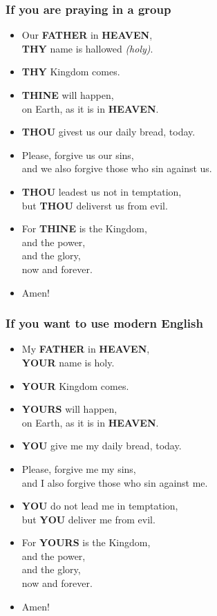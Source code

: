 \documentclass[12pt,a4paper]{article}
\newcommand{\Father}[0]{\textbf{FATHER}}
\newcommand{\Heaven}[0]{\textbf{HEAVEN}}
\newcommand{\Thine}[0]{\textbf{THINE}}
\newcommand{\Thou}[0]{\textbf{THOU}}
\newcommand{\Thy}[0]{\textbf{THY}}
\newcommand{\You}[0]{\textbf{YOU}}
\newcommand{\Your}[0]{\textbf{YOUR}}
\newcommand{\Yours}[0]{\textbf{YOURS}}
\begin{document}
		\subsubsection{If you are praying in a group}
			\begin{itemize}[nosep]
				\item	Our {\Father} in {\Heaven},
						\\
						{\Thy} name is hallowed \textit{(holy)}.
				\item	{\Thy} Kingdom comes.
				\item	{{\Thine} will happen},
						\\
						on Earth,
						as it is in {\Heaven}.
				\item	{\Thou} givest us our daily bread,
						today.
				\item	Please,
						forgive us our sins,
						\\
						and we also forgive those who sin against us.
				\item	{\Thou} leadest us not in temptation,
						\\
						but {\Thou} deliverst us from evil.
				\item	For {\Thine} is the Kingdom,
						\\
						and the power,
						\\
						and the glory,
						\\
						now and forever.
				\item	Amen!
			\end{itemize}

		\subsubsection{If you want to use modern English}
			\begin{itemize}[nosep]
				\item	My {\Father} in {\Heaven},
						\\
						{\Your} name is holy.
				\item	{\Your} Kingdom comes.
				\item	{{\Yours} will happen},
						\\
						on Earth,
						as it is in {\Heaven}.
				\item	{\You} give me my daily bread,
						today.
				\item	Please,
						forgive me my sins,
						\\
						and I also forgive those who sin against me.
				\item	{\You} do not lead me in temptation,
						\\
						but {\You} deliver me from evil.
				\item	For {\Yours} is the Kingdom,
						\\
						and the power,
						\\
						and the glory,
						\\
						now and forever.
				\item	Amen!
			\end{itemize}
\end{document}
